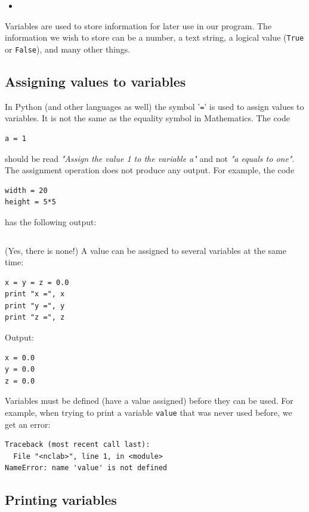 \begin{itemize}
\item
\end{itemize}


Variables are used to store information for later use in our program. The information
we wish to store can be a number, a text string, a logical value ({\tt True} or {\tt False}),
and many other things. 

\subsection{Assigning values to variables}

In Python (and other languages as well) the symbol '{\tt =}' is used to assign 
values to variables. It is not the same as the equality symbol in Mathematics. 
The code

\begin{verbatim}
a = 1
\end{verbatim}
should be read {\em "Assign the value 1 to the variable a"} and not {\em "a equals to one"}.
The assignment operation does not produce any output. For example, the code

\begin{verbatim}
width = 20
height = 5*5
\end{verbatim}
has the following output:

\begin{verbatim}

\end{verbatim}
(Yes, there is none!) A value can be assigned to several variables at the same time:

\begin{verbatim}
x = y = z = 0.0
print "x =", x
print "y =", y
print "z =", z
\end{verbatim}
Output:

\begin{verbatim}
x = 0.0
y = 0.0
z = 0.0
\end{verbatim}
Variables must be defined (have a value assigned) before they can be 
used. For example, when trying to print a variable {\tt value} that 
was never used before, we get an error:

\begin{verbatim}
Traceback (most recent call last):
  File "<nclab>", line 1, in <module>
NameError: name 'value' is not defined
\end{verbatim}

\subsection{Printing variables}


